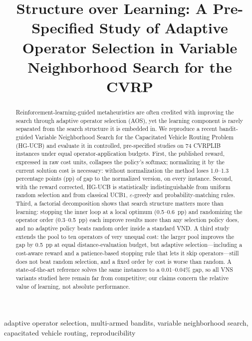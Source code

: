 \documentclass[conference]{IEEEtran}
\begin{document}
\title{Structure over Learning: A Pre-Specified Study of Adaptive Operator Selection in Variable Neighborhood Search for the CVRP}

\author{
}

\maketitle

\begin{abstract}
Reinforcement-learning-guided metaheuristics are often credited with improving the search through adaptive operator selection (AOS), yet the learning component is rarely separated from the search structure it is embedded in. We reproduce a recent bandit-guided Variable Neighborhood Search for the Capacitated Vehicle Routing Problem (HG-UCB) and evaluate it in controlled, pre-specified studies on 74 CVRPLIB instances under equal operator-application budgets. First, the published reward, expressed in raw cost units, collapses the policy's softmax; normalizing it by the current solution cost is necessary: without normalization the method loses 1.0--1.3 percentage points (pp) of gap to the normalized version, on every instance. Second, with the reward corrected, HG-UCB is statistically indistinguishable from uniform random selection and from classical UCB1, $\varepsilon$-greedy and probability-matching rules. Third, a factorial decomposition shows that search structure matters more than learning: stopping the inner loop at a local optimum (0.5--0.6~pp) and randomizing the operator order (0.3--0.5~pp) each improve results more than any selection policy does, and no adaptive policy beats random order inside a standard VND. A third study extends the pool to ten operators of very unequal cost: the larger pool improves the gap by 0.5~pp at equal distance-evaluation budget, but adaptive selection---including a cost-aware reward and a patience-based stopping rule that lets it skip operators---still does not beat random selection, and a fixed order by cost is worse than random. A state-of-the-art reference solves the same instances to a 0.01--0.04\% gap, so all VNS variants studied here remain far from competitive; our claims concern the relative value of learning, not absolute performance.
\end{abstract}

\begin{IEEEkeywords}
adaptive operator selection, multi-armed bandits, variable neighborhood search, capacitated vehicle routing, reproducibility
\end{IEEEkeywords}
\end{document}
